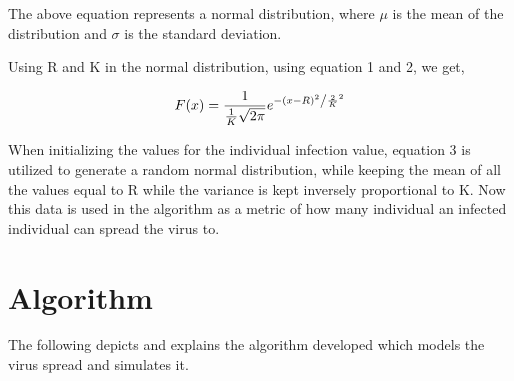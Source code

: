 \documentclass[11pt]{article}
\begin{document}
The above equation represents a normal distribution, where $\mu$ is the mean of the distribution and $\sigma$ is the standard deviation.

Using R and K in the normal distribution, using equation 1 and 2, we get,

\begin{equation}
    F(x) = \frac{1}{{\frac{1}{K} \sqrt {2\pi } }}e^{{{ - \left( {x - R } \right)^2 } \mathord{\left/ {\vphantom {{ - \left( {x - R } \right)^2 } {\frac{2}{K} ^2 }}} \right. \kern-\nulldelimiterspace} {\frac{2}{K} ^2 }}}
\end{equation}

When initializing the values for the individual infection value, equation 3 is utilized to generate a random normal distribution, while keeping the mean of all the values equal to R while the variance is kept inversely proportional to K. Now this data is used in the algorithm as a metric of how many individual an infected individual can spread the virus to.

\pagebreak
\section{Algorithm}
The following depicts and explains the algorithm developed which models the virus spread and simulates it.
\end{document}

